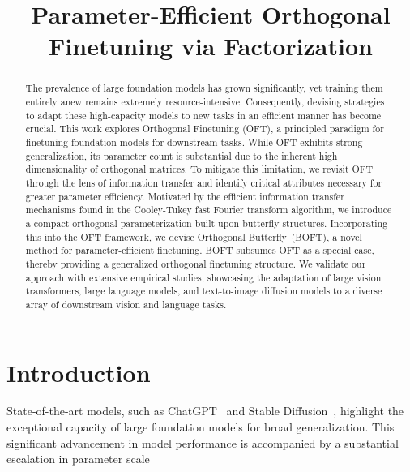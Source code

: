 \title{Parameter-Efficient Orthogonal Finetuning via Factorization}

\begin{abstract}
The prevalence of large foundation models has grown significantly, yet training them entirely anew remains extremely resource-intensive. Consequently, devising strategies to adapt these high-capacity models to new tasks in an efficient manner has become crucial. This work explores Orthogonal Finetuning (OFT), a principled paradigm for finetuning foundation models for downstream tasks. While OFT exhibits strong generalization, its parameter count is substantial due to the inherent high dimensionality of orthogonal matrices. To mitigate this limitation, we revisit OFT through the lens of information transfer and identify critical attributes necessary for greater parameter efficiency. Motivated by the efficient information transfer mechanisms found in the Cooley-Tukey fast Fourier transform algorithm, we introduce a compact orthogonal parameterization built upon butterfly structures. Incorporating this into the OFT framework, we devise Orthogonal Butterfly~(BOFT), a novel method for parameter-efficient finetuning. BOFT subsumes OFT as a special case, thereby providing a generalized orthogonal finetuning structure. We validate our approach with extensive empirical studies, showcasing the adaptation of large vision transformers, large language models, and text-to-image diffusion models to a diverse array of downstream vision and language tasks.
\end{abstract}

\section{Introduction}

State-of-the-art models, such as ChatGPT~\cite{brown2020language,chen2021evaluating} and Stable Diffusion~\cite{rombach2022high}, highlight the exceptional capacity of large foundation models for broad generalization. This significant advancement in model performance is accompanied by a substantial escalation in parameter scale 

